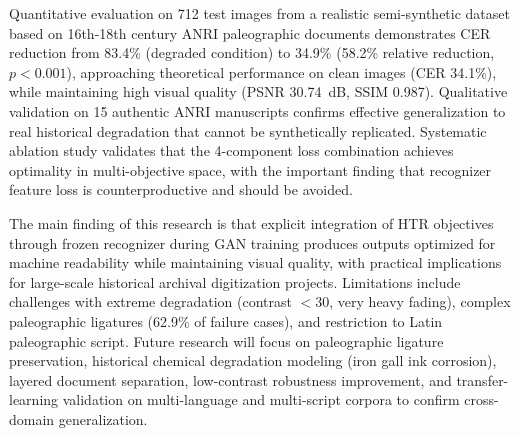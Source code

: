 \documentclass[journal]{IEEEtran}
\begin{document}
Quantitative evaluation on 712 test images from a realistic semi-synthetic dataset based on 16th-18th century ANRI paleographic documents demonstrates CER reduction from 83.4\% (degraded condition) to 34.9\% (58.2\% relative reduction, $p<0.001$), approaching theoretical performance on clean images (CER 34.1\%), while maintaining high visual quality (PSNR 30.74~dB, SSIM 0.987). Qualitative validation on 15 authentic ANRI manuscripts confirms effective generalization to real historical degradation that cannot be synthetically replicated. Systematic ablation study validates that the 4-component loss combination achieves optimality in multi-objective space, with the important finding that recognizer feature loss is counterproductive and should be avoided.

The main finding of this research is that explicit integration of HTR objectives through frozen recognizer during GAN training produces outputs optimized for machine readability while maintaining visual quality, with practical implications for large-scale historical archival digitization projects. Limitations include challenges with extreme degradation (contrast $<$30, very heavy fading), complex paleographic ligatures (62.9\% of failure cases), and restriction to Latin paleographic script. Future research will focus on paleographic ligature preservation, historical chemical degradation modeling (iron gall ink corrosion), layered document separation, low-contrast robustness improvement, and transfer-learning validation on multi-language and multi-script corpora to confirm cross-domain generalization.
\end{document}
